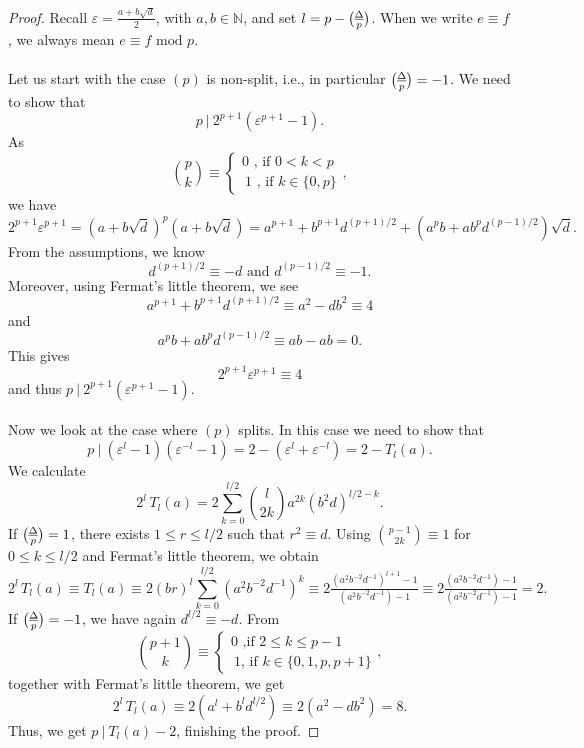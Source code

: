 \documentclass[10pt,a4paper]{amsart}
\newcommand{\ep}{\varepsilon}
\newcommand{\eq}[1]{\begin{equation}#1\end{equation}}
\newcommand{\genlegendre}[4]{%
  \genfrac{(}{)}{}{#1}{#3}{#4}%
  \if\relax\detokenize{#2}\relax\else_{\!#2}\fi
}
\newcommand{\legendre}[3][]{\genlegendre{}{#1}{#2}{#3}}
\begin{document}
\begin{proof}
Recall $\ep = \tfrac{a + b\sqrt{d} } 2$, with $a,b \in \mathbb N$, and set $l = p-\legendre{\Delta}{p}$. When we write $e\equiv f$, we always mean $e \equiv f \text{ mod $p$}$. \\ \\
Let us start with the case $(p)$ is non-split, i.e., in particular $\legendre{\Delta}{p} = -1$. We need to show that \eq{p \ | \ 2^{p+1}(\ep^{p+1}-1).} As \eq{\binom{p}{k} \equiv \left\{ \begin{array}{c} 0 \text{ , if $0 < k < p$} \\  \  1 \text{ , if $k \in \{0,p\}$}  \end{array}  \right. ,} we have \eq{2^{p+1} \ep^{p+1} = (a+b\sqrt{d} )^p(a+b\sqrt{d} ) = a^{p+1}+b^{p+1} d^{(p+1)/2} +(a^p b + a b^p d^{(p-1)/2} ) \sqrt{d}.} From the assumptions, we know \eq{d^{(p+1)/2} \equiv -d \text{ and } d^{(p-1)/2} \equiv -1 .} Moreover, using Fermat's little theorem, we see \eq{a^{p+1}+b^{p+1} d^{(p+1)/2} \equiv a^2 -d b^2 \equiv 4} and \eq{a^p b + a b^p d^{(p-1)/2} \equiv ab - ab = 0.} This gives \eq{2^{p+1}\ep^{p+1} \equiv 4 } and thus $p \ \vert \ 2^{p+1}(\ep^{p+1}-1)$. \\ \\
Now we look at the case where $(p)$ splits. In this case we need to show that \eq{p \ \vert \ (\ep^{l}-1) (\ep^{-l}-1) = 2 - (\ep^{l} + \ep^{-l}) = 2- T_l(a).} We calculate \eq{2^l \, T_l(a) = 2 \sum_{k=0}^{l/2} \binom{l}{2k}a^{2k} (b^2d)^{l/2-k}.} If $\legendre{\Delta}{p} = 1$, there exists $1\leq r \leq l/2$ such that $r^2 \equiv d$. Using $\binom{p-1}{2k} \equiv 1 $ for $0 \leq k \leq l/2$ and Fermat's little theorem, we obtain \eq{2^l \, T_l(a) \equiv T_l(a) \equiv 2 (br)^l \sum_{k=0}^{l / 2}(a^2b^{-2}d^{-1})^k \equiv 2 \tfrac{(a^2b^{-2}d^{-1})^{l+1}-1}{(a^2b^{-2}d^{-1})-1} \equiv 2 \tfrac{(a^2b^{-2}d^{-1})-1}{(a^2b^{-2}d^{-1})-1} = 2.} If $\legendre{\Delta}{p}=-1$, we have again $d^{l/2}\equiv -d $. From \eq{\binom{p+1}{k} \equiv \left\{ \begin{array}{c} 0 \text{ ,if $2 \leq k \leq p-1$} \\  \  1 \text{, if $k \in \{0,1,p,p+1\}$}  \end{array}  \right. ,} together with Fermat's little theorem, we get \eq{2^l \, T_l(a) \equiv 2(a^l+b^l d^{l/2}) \equiv 2(a^2 - d b^2 ) = 8 .} Thus, we get $p \ \vert \ T_l(a) - 2$, finishing the proof.
\end{proof}
\end{document}
